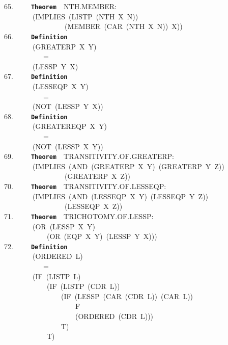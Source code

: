 \documentclass[11pt]{book}
\newenvironment{pubasis}{\begin{flushleft}\ttfamily\small}{\normalsize\rmfamily\end{flushleft}}
\newcommand{\axiomordefinition}[1]{\vspace{6pt}\texttt{\textbf{#1}}}
\begin{document}
\begin{pubasis}
65.~~~~~\axiomordefinition{Theorem}~~NTH.MEMBER:\\
~~~~~~~~(IMPLIES~(LISTP~(NTH~X~N))\\
~~~~~~~~~~~~~~~~~(MEMBER~(CAR~(NTH~X~N))~X))\\

66.~~~~~\axiomordefinition{Definition}\\
~~~~~~~~(GREATERP~X~Y)\\
~~~~~~~~~~~=\\
~~~~~~~~(LESSP~Y~X)\\

67.~~~~~\axiomordefinition{Definition}\\
~~~~~~~~(LESSEQP~X~Y)\\
~~~~~~~~~~~=\\
~~~~~~~~(NOT~(LESSP~Y~X))\\

68.~~~~~\axiomordefinition{Definition}\\
~~~~~~~~(GREATEREQP~X~Y)\\
~~~~~~~~~~~=\\
~~~~~~~~(NOT~(LESSP~X~Y))\\

69.~~~~~\axiomordefinition{Theorem}~~TRANSITIVITY.OF.GREATERP:\\
~~~~~~~~(IMPLIES~(AND~(GREATERP~X~Y)~(GREATERP~Y~Z))\\
~~~~~~~~~~~~~~~~~(GREATERP~X~Z))\\

70.~~~~~\axiomordefinition{Theorem}~~TRANSITIVITY.OF.LESSEQP:\\
~~~~~~~~(IMPLIES~(AND~(LESSEQP~X~Y)~(LESSEQP~Y~Z))\\
~~~~~~~~~~~~~~~~~(LESSEQP~X~Z))\\

71.~~~~~\axiomordefinition{Theorem}~~TRICHOTOMY.OF.LESSP:\\
~~~~~~~~(OR~(LESSP~X~Y)\\
~~~~~~~~~~~~(OR~(EQP~X~Y)~(LESSP~Y~X)))\\

72.~~~~~\axiomordefinition{Definition}\\
~~~~~~~~(ORDERED~L)\\
~~~~~~~~~~~=\\
~~~~~~~~(IF~(LISTP~L)\\
~~~~~~~~~~~~(IF~(LISTP~(CDR~L))\\
~~~~~~~~~~~~~~~~(IF~(LESSP~(CAR~(CDR~L))~(CAR~L))\\
~~~~~~~~~~~~~~~~~~~~F\\
~~~~~~~~~~~~~~~~~~~~(ORDERED~(CDR~L)))\\
~~~~~~~~~~~~~~~~T)\\
~~~~~~~~~~~~T)\\


\end{pubasis}
\end{document}
